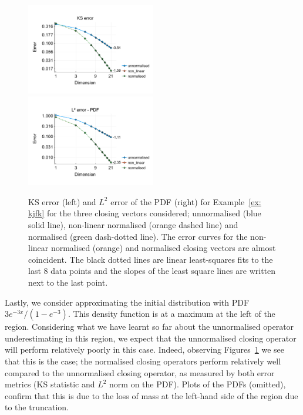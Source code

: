\begin{example}\label{ex: kjfk}
	\begin{figure}[h]
		\centering
		\includegraphics[width=0.5\textwidth,trim={0.5cm 0.8cm 0.2cm 1.25cm},clip]{chapter6/figs/qbdrap_closing_vec/fun7/ks_error_formatted.pdf}%
		\includegraphics[width=0.5\textwidth,trim={0.5cm 0.8cm 0.2cm 1.25cm},clip]{chapter6/figs/qbdrap_closing_vec/fun7/l2_pdf_error_formatted.pdf}
		\caption{KS error (left) and \(L^2\) error of the PDF (right) for Example~\ref{ex: kjfk} for the three closing vectors considered; unnormalised (blue solid line), non-linear normalised (orange dashed line) and normalised (green dash-dotted line). The error curves for the non-linear normalised (orange) and normalised closing vectors are almost coincident. The black dotted lines are linear least-squares fits to the last 8 data points and the slopes of the least square lines are written next to the last point.}
		\label{fig: fun 7 ks error qbdrap closing vecs}
	\end{figure}
	Lastly, we consider approximating the initial distribution with PDF \(3e^{-3x}/(1-e^{-3})\). This density function is at a maximum at the left of the region. Considering what we have learnt so far about the unnormalised operator underestimating in this region, we expect that the unnormalised closing operator will perform relatively poorly in this case. Indeed, observing Figures~\ref{fig: fun 7 ks error qbdrap closing vecs} we see that this is the case; the normalised closing operators perform relatively well compared to the unnormalised closing operator, as measured by both error metrics (KS statistic and \(L^2\) norm on the PDF). Plots of the PDFs (omitted), confirm that this is due to the loss of mass at the left-hand side of the region due to the truncation. 
\end{example}

